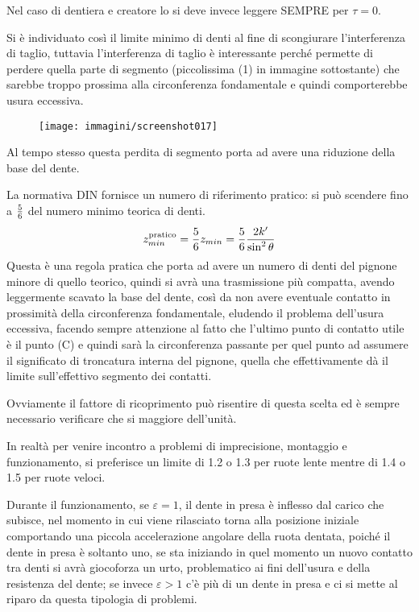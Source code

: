 \documentclass[a4paper, 15pt]{article}
\begin{document}
\begin{adjustwidth}{2in}{}
		Nel caso di dentiera e creatore lo si deve invece leggere SEMPRE per $\tau=0$. \newline 
		
		Si è individuato così il limite minimo di denti al fine di scongiurare l'interferenza di taglio, tuttavia  l'interferenza di taglio è interessante perché permette di perdere quella parte di segmento (piccolissima (1) in immagine sottostante) che sarebbe troppo prossima alla circonferenza fondamentale e quindi comporterebbe usura eccessiva.
		\begin{figure}[H]
			\centering
			\texttt{[image: immagini/screenshot017]}
			\label{fig:screenshot017}
		\end{figure}
		Al tempo stesso questa perdita di segmento porta ad avere una riduzione della base del dente.
		
		La normativa DIN fornisce un  numero di riferimento pratico: si può scendere fino a $5\over6$ del numero minimo teorica di denti.
		\[	z_{min}^\text{pratico} = {5\over6}z_{min} = {5\over6}\dfrac{2k'}{\sin^2\theta} \]
		Questa è una regola pratica che porta ad avere  un numero di denti del pignone minore di quello teorico, quindi si avrà una trasmissione più compatta, avendo leggermente scavato la base del dente, così da non avere eventuale contatto in prossimità della circonferenza fondamentale, eludendo il problema dell'usura eccessiva, facendo sempre attenzione al fatto che l'ultimo punto di contatto utile è il punto (C) e quindi sarà la circonferenza passante per quel punto ad assumere il significato di troncatura interna del pignone, quella che effettivamente dà il limite sull'effettivo segmento dei contatti. \newline 
		
		Ovviamente il fattore di ricoprimento può risentire di questa scelta ed è sempre necessario verificare che si maggiore dell'unità. 
		
		In realtà per venire incontro a problemi di imprecisione, montaggio e funzionamento, si preferisce un limite di 1.2 o 1.3 per ruote lente mentre di 1.4 o 1.5 per ruote veloci. 
		
		Durante il funzionamento, se $\varepsilon = 1$, il dente in presa è inflesso dal carico che subisce, nel momento in cui viene rilasciato torna alla posizione iniziale comportando una piccola accelerazione angolare della ruota dentata, poiché il dente in presa è soltanto uno, se sta iniziando in quel momento un nuovo contatto tra denti si avrà giocoforza un urto, problematico ai fini dell'usura e della resistenza del dente; se invece $\varepsilon>1$ c'è più di un dente in presa e ci si mette al riparo da questa tipologia di problemi. \newline 
		

\end{adjustwidth}
\end{document}
